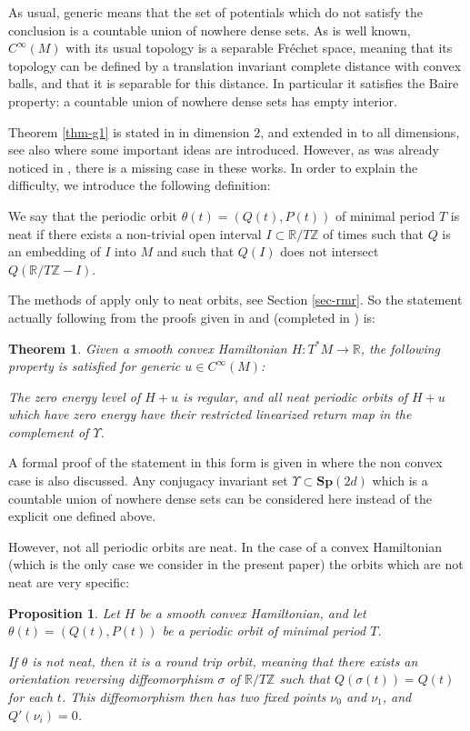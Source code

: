 \documentclass[11pt]{article}
\newcommand{\Rm}{\mathbb{R}}
\newcommand{\Zm}{\ensuremath{\mathbb{Z}}}
\newcommand{\Sp}{\mathbf{Sp}}
\theoremstyle{plain}
\newtheorem{thm}{Theorem}
\newtheorem{prop}[lem]{Proposition}
\theoremstyle{definition}
\begin{document}
As usual, generic means that the set of potentials which do not satisfy the conclusion is a countable union of nowhere dense sets. As is well known, $C^{\infty}(M)$ with its usual topology is a separable Fréchet space,
meaning that its topology can be defined by a translation invariant complete distance with convex balls, and that it is separable for this distance. In particular it satisfies the Baire property: a countable union of nowhere dense sets has empty interior.

Theorem \ref{thm-g1} is stated in \cite{O08} in dimension $2$, and extended in \cite{RR} to all dimensions, see also \cite{Co10}
where some important ideas are introduced. However, as was already noticed in \cite{AB2},
there is a missing case in these works.
In order to explain the difficulty, we introduce the following definition:

We say that the periodic orbit $\theta(t)=(Q(t), P(t))$ of minimal period $T$ is neat if there exists a non-trivial open interval $I\subset \Rm/T\Zm$ of times such that $Q$ is an embedding of $I$ into $M$ and such that
$Q(I)$ does not intersect $Q(\Rm/T\Zm-I)$.

The methods of \cite{O08,RR} apply only to neat orbits, see Section \ref{sec-rmr}. So the statement actually following from the proofs given in \cite{O08} and \cite{RR}
(completed in \cite{AB}) is:

\begin{thm}\label{thm-g2}
Given a smooth convex Hamiltonian $H: T^*M\rightarrow \Rm$,
the following property is satisfied for generic $u\in C^{\infty}(M)$:

The zero energy level of $H+u$ is regular, and all \emph{neat}
periodic orbits of $H+u$ which have zero energy have their restricted linearized
return map in the complement of $\Upsilon$.
\end{thm}

A formal proof of the statement in this form is given in \cite{AB2} where the non convex case is also discussed. Any
conjugacy invariant set $\Upsilon\subset \Sp(2d)$ which is a countable union of nowhere dense sets can be considered here instead of the explicit one defined above.

However, not all periodic orbits are neat.
In the case of a convex Hamiltonian (which is the only case we consider in the present paper) the orbits which are not neat are very specific:

\begin{prop}\label{prop-neat}
Let $H$ be a smooth convex Hamiltonian, and let $\theta(t)=(Q(t),P(t))$ be a periodic orbit of minimal period $T$.

If $\theta$ is not neat, then it is a \textit{round trip} orbit, meaning that
there exists an orientation reversing diffeomorphism $\sigma$ of $\Rm/T\Zm$ such that $Q(\sigma(t))=Q(t)$ for each $t$. This diffeomorphism then has two fixed points $\nu_0$ and $\nu_1$, and $Q'(\nu_i)=0$.
\end{prop}
\end{document}

